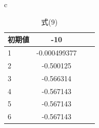 \documentclass{jsarticle}
\begin{document}
\begin{table}[htbp]
\begin{center}
\begin{tabular}{c}
        \end{tabular}
    \end{center}
\end{table}

\begin{table}[htbp]
    \begin{center}
        \begin{tabular}{c}

            \begin{minipage}{0.3\hsize}
                \begin{center}
                    \begin{tabular}{|l|c|r||r|} \hline
                        初期値 & -10 \\ \hline \hline
                        1 & -0.000499377\\ \hline
                        2 & -0.500125\\ \hline
                        3 & -0.566314\\ \hline
                        4 & -0.567143\\ \hline
                        5 & -0.567143\\ \hline
                        6 & -0.567143\\ \hline
                    \end{tabular}
                    \caption{式(9)}
                \end{center}
            \end{minipage}

        \end{tabular}
    \end{center}
\end{table}
\end{document}
